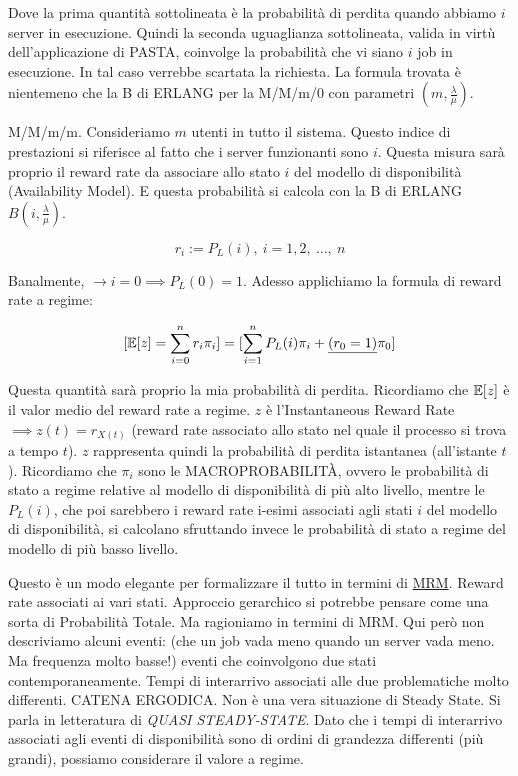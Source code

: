 Dove la prima quantità sottolineata è la probabilità di perdita quando abbiamo $i$ server in esecuzione. Quindi la seconda uguaglianza sottolineata, valida in virtù dell'applicazione di PASTA, coinvolge la probabilità che vi siano $i$ job in esecuzione. In tal caso verrebbe scartata la richiesta. La formula trovata è nientemeno che la B di ERLANG per la M/M/m/0 con parametri $(m,\frac{\lambda}{\mu})$. 

M/M/m/m. Consideriamo $m$ utenti in tutto il sistema. Questo indice di prestazioni si riferisce al fatto che i server funzionanti sono $i$. Questa misura sarà proprio il reward rate da associare allo stato $i$ del modello di disponibilità (Availability Model). E questa probabilità si calcola con la B di ERLANG $B(i,\frac{\lambda}{\mu})$.

\[
	r_i := P_L(i),\ i=1,2,\ \dots,\ n
\]

Banalmente, $\rightarrow i=0 \implies P_L(0) = 1$. Adesso applichiamo la formula di reward rate a regime:

\[
	[\operatorname{\mathbb{E}}[z] = \sum_{i=0}^n{r_i\pi_i}] = [\sum_{i=1}^n{P_L(i)\pi_i} + \underline{(r_0=1)}\pi_0]
\]

Questa quantità sarà proprio la mia probabilità di perdita. Ricordiamo che $\operatorname{\mathbb{E}}[z]$ è il valor medio del reward rate a regime. $z$ è l'Instantaneous Reward Rate $\implies z(t) = r_{X(t)}$ (reward rate associato allo stato nel quale il processo si trova a tempo $t$). $z$ rappresenta quindi la probabilità di perdita istantanea (all'istante $t$). Ricordiamo che $\pi_i$ sono le MACROPROBABILIT\`A, ovvero le probabilità di stato a regime relative al modello di disponibilità di più alto livello, mentre le $P_L(i)$, che poi sarebbero i reward rate i-esimi associati agli stati $i$ del modello di disponibilità, si calcolano sfruttando invece le probabilità di stato a regime del modello di più basso livello.

Questo è un modo elegante per formalizzare il tutto in termini di \underline{MRM}. Reward rate associati ai vari stati. Approccio gerarchico si potrebbe pensare come una sorta di Probabilità Totale. Ma ragioniamo in termini di MRM. Qui però non descriviamo alcuni eventi: (che un job vada meno quando un server vada meno. Ma frequenza molto basse!) eventi che coinvolgono due stati contemporaneamente. Tempi di interarrivo associati alle due problematiche molto differenti. CATENA ERGODICA. Non è una vera situazione di Steady State. Si parla in letteratura di \textit{QUASI STEADY-STATE}. Dato che i tempi di interarrivo associati agli eventi di disponibilità sono di ordini di grandezza differenti (più grandi), possiamo considerare il valore a regime.

